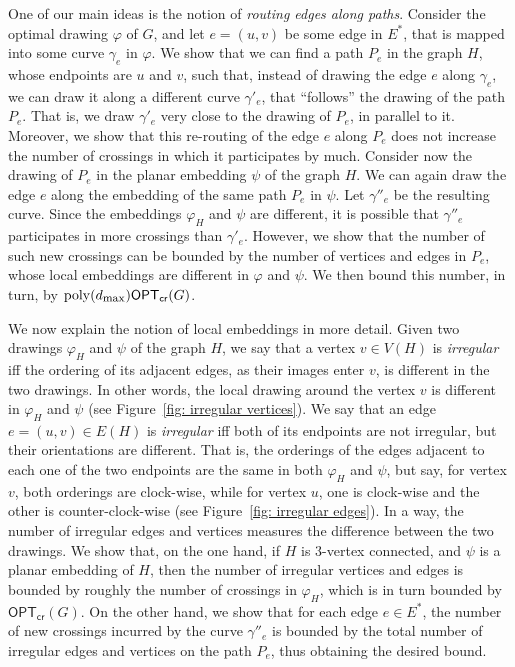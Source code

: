 \documentclass[twoside,leqno,twocolumn]{article}
\renewcommand{\phi}{\varphi}
\newcommand{\poly}{\operatorname{poly}}
\newcommand{\optcro}[1]{\mathsf{OPT}_{\mathsf{cr}}(#1)}
\newcommand{\dmax}{d_{\mbox{\textup{\footnotesize{max}}}}}
\begin{document}
One of our main ideas is the notion of \emph{routing edges along paths}. Consider the optimal drawing $\phi$ of $G$, and let $e=(u,v)$ be some
edge in $E^*$, that is mapped into some curve $\gamma_e$ in $\phi$. We show that we can find a path $P_e$ in the graph $H$, whose endpoints are $u$ and $v$, such that, instead of drawing the edge $e$ along $\gamma_e$, we can draw it along a different curve $\gamma'_e$, that ``follows'' the drawing of the path $P_e$. That is, we draw $\gamma'_e$ very close to the drawing of $P_e$, in parallel to it. Moreover, we show that this re-routing of the edge $e$ along $P_e$ does not increase the number of crossings in which it participates by much. Consider now the drawing of $P_e$ in the planar embedding $\psi$ of the graph $H$. We can again draw the edge $e$ along the embedding of the same path $P_e$ in $\psi$. Let $\gamma''_e$ be the resulting curve. Since the embeddings $\phi_H$ and $\psi$ are different, it is possible that $\gamma''_e$ participates in more crossings than $\gamma'_e$. However, we show that the number of such new crossings can be bounded by the number of vertices and edges in $P_e$, whose local embeddings are different in $\phi$ and $\psi$. We then bound this number, in turn, by $\poly(\dmax)\optcro{G}$.

We now explain the notion of local embeddings in more detail. Given two drawings $\phi_H$ and $\psi$ of the graph $H$, we say that a vertex $v\in V(H)$ is \emph{irregular} iff the ordering of its adjacent edges, as their images enter $v$, is different in the two drawings. In other words, the local drawing around the vertex $v$ is different in $\phi_H$ and $\psi$ (see Figure~\ref{fig: irregular vertices}). We say that an edge $e=(u,v)\in E(H)$ is \emph{irregular} iff both of its endpoints are not irregular, but their orientations are different. That is, the orderings of the edges adjacent to each one of the two endpoints are the same in both $\phi_H$ and $\psi$, but say, for vertex $v$, both orderings are clock-wise, while for vertex $u$, one is clock-wise and the other is counter-clock-wise (see Figure~\ref{fig: irregular edges}). In a way, the number of irregular edges and vertices measures the difference between the two drawings. We show that, on the one hand, if $H$ is $3$-vertex connected, and $\psi$ is a planar embedding of $H$, then the number of irregular vertices and edges is bounded by roughly the number of crossings in $\phi_H$, which is in turn bounded by $\optcro{G}$. On the other hand, we show that for each edge $e\in E^*$, the number of new crossings incurred by the curve $\gamma''_e$ is bounded by the total number of irregular edges and vertices on the path $P_e$, thus obtaining the desired bound.
\end{document}
